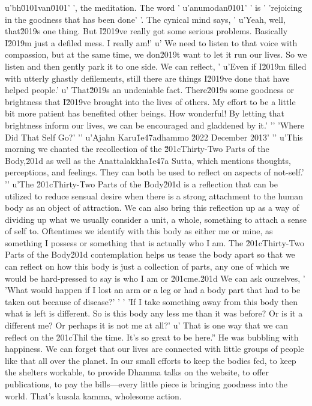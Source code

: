 u'bh\u0101van\u0101'
', the meditation. The word '
u'anumodan\u0101'
' is '
'rejoicing in the goodness that has been done'
'. The cynical mind says, '
u'Yeah, well, that\u2019s one thing. But I\u2019ve really got some serious problems. Basically I\u2019m just a defiled mess. I really am!'
u' We need to listen to that voice with compassion, but at the same time, we don\u2019t want to let it run our lives. So we listen and then gently park it to one side. We can reflect, '
u'Even if I\u2019m filled with utterly ghastly defilements, still there are things I\u2019ve done that have helped people.'
u' That\u2019s an undeniable fact. There\u2019s some goodness or brightness that I\u2019ve brought into the lives of others. My effort to be a little bit more patient has benefited other beings. How wonderful! By letting that brightness inform our lives, we can be encouraged and gladdened by it.'
'\n'
'Where Did That Self Go?'
'\n'
u'Ajahn Karu\u1e47adhammo \u2022 December 2013'
'\n'
u'This morning we chanted the recollection of the \u201cThirty-Two Parts of the Body,\u201d as well as the Anattalakkha\u1e47a Sutta, which mentions thoughts, perceptions, and feelings. They can both be used to reflect on aspects of not-self.'
'\n'
u'The \u201cThirty-Two Parts of the Body\u201d is a reflection that can be utilized to reduce sensual desire when there is a strong attachment to the human body as an object of attraction. We can also bring this reflection up as a way of dividing up what we usually consider a unit, a whole, something to attach a sense of self to. Oftentimes we identify with this body as either me or mine, as something I possess or something that is actually who I am. The \u201cThirty-Two Parts of the Body\u201d contemplation helps us tease the body apart so that we can reflect on how this body is just a collection of parts, any one of which we would be hard-pressed to say is who I am or \u201cme.\u201d We can ask ourselves, '
'What would happen if I lost an arm or a leg or had a body part that had to be taken out because of disease?'
' '
'If I take something away from this body then what is left is different. So is this body any less me than it was before? Or is it a different me? Or perhaps it is not me at all?'
u' That is one way that we can reflect on the \u201cThil the time. It's so great to be here.'' He was 
bubbling with happiness. We can forget that our lives are connected 
with little groups of people like that all over the planet. In our 
small efforts to keep the bodies fed, to keep the shelters workable, to 
provide Dhamma talks on the website, to offer publications, to pay the 
bills---every little piece is bringing goodness into the world. That's 
kusala kamma, wholesome action.


